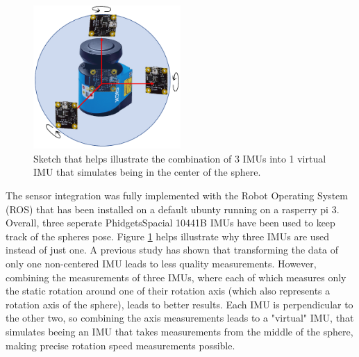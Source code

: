 \begin{figure}                                                                                                                                                                                                    
\centering
\includegraphics[width=0.5\textwidth]{../Media/virtualIMU.png}                                                                                                                                                      
\caption{Sketch that helps illustrate the combination of 3 IMUs into 1 virtual IMU that simulates being in the center of the sphere.}                                                                                                                           
\label{sec:SensorIntegration:fig:virtual}                                                                                                                                                                       
\end{figure}                                                                                                                                                                                                      

The sensor integration was fully implemented with the Robot Operating System (ROS) that has been installed on a default ubunty running on a rasperry pi 3.
Overall, three seperate PhidgetsSpacial 10441B IMUs \cite{imuphidgets} have been used to keep track of the spheres pose. Figure \ref{sec:SensorIntegration:fig:virtual} helps illustrate why three IMUs are used instead of just one. A previous study has shown that transforming the data of only one non-centered IMU leads to less quality measurements. However, combining the measurements of three IMUs, where each of which measures only the static rotation around one of their rotation axis (which also represents a rotation axis of the sphere), leads to better results. Each IMU is perpendicular to the other two, so combining the axis measurements leads to a "virtual" IMU, that simulates beeing an IMU that takes measurements from the middle of the sphere, making precise rotation speed measurements possible. 

